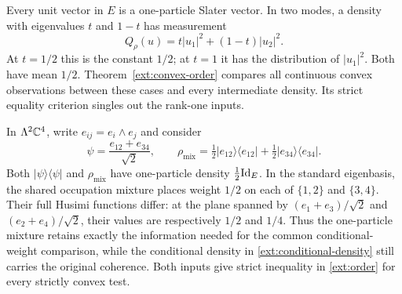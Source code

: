 \begin{example}
\label{ext:one-particle-example}
Every unit vector in $E$ is a one-particle Slater vector. In two
modes, a density with eigenvalues $t$ and $1-t$ has measurement
\[
 Q_\rho(u)=t|u_1|^2+(1-t)|u_2|^2.
\]
At $t=1/2$ this is the constant $1/2$; at $t=1$ it has the
distribution of $|u_1|^2$. Both have mean $1/2$. Theorem~\ref{ext:convex-order}
compares all continuous convex observations between these cases and
every intermediate density. Its strict equality criterion singles
out the rank-one inputs.
\end{example}

\begin{example}
\label{ext:two-particle-example}
In $\Lambda^2\mathbb C^4$, write $e_{ij}=e_i\wedge e_j$ and consider
\[
 \psi=\frac{e_{12}+e_{34}}{\sqrt2},\qquad
 \rho_{\mathrm{mix}}
 =\tfrac12|e_{12}\rangle\langle e_{12}|
  +\tfrac12|e_{34}\rangle\langle e_{34}|.
\]
Both $|\psi\rangle\langle\psi|$ and $\rho_{\mathrm{mix}}$ have
one-particle density $\tfrac12\mathrm{Id}_E$. In the standard eigenbasis,
the shared occupation mixture places weight $1/2$ on each of
$\{1,2\}$ and $\{3,4\}$. Their full Husimi functions differ:
at the plane spanned by $(e_1+e_3)/\sqrt2$ and
$(e_2+e_4)/\sqrt2$, their values are respectively $1/2$ and $1/4$.
Thus the one-particle mixture retains exactly the information needed
for the common conditional-weight comparison, while the conditional
density in \eqref{ext:conditional-density} still carries the original
coherence. Both inputs give strict inequality in
\eqref{ext:order} for every strictly convex test.
\end{example}

